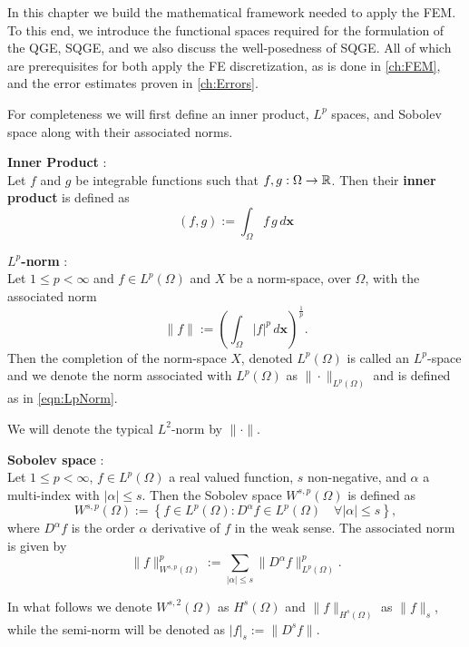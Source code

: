In this chapter we build the mathematical framework needed to apply the FEM. To
this end, we introduce the functional spaces required for the formulation of the
QGE, SQGE, and we also discuss the well-posedness of SQGE. All of which are
prerequisites for both apply the FE discretization, as is done in
\autoref{ch:FEM}, and the error estimates proven in \autoref{ch:Errors}.

For completeness we will first define an inner product, $L^p$ spaces, and
Sobolev space along with their associated norms.

\begin{definition} \label{def:InnerProduct}
  \textbf{Inner Product} \cite{Kreyszig1989}: \\
  Let $f$ and $g$ be integrable functions such that $f,g : \Omega \rightarrow \mathbb{R}$.
  Then their \textbf{inner product} is defined as
  \begin{equation}
    (f,g) := \int_{\Omega}\! f \, g\, d\mathbf{x}
    \label{eqn:InnerProduct}
  \end{equation}
\end{definition}

\begin{definition} \label{def:LpNorm}
  \textbf{$L^p$-norm} \cite{Kreyszig1989}: \\
  Let $1\le p < \infty$ and $f \in L^p(\Omega)$ and $X$ be a norm-space, over
  $\Omega$, with the associated norm
  \begin{equation}
    \|f\| := \left(\int_{\Omega}\! |f|^p\, d\mathbf{x}\right)^{\frac{1}{p}}.
    \label{eqn:LpNorm}
  \end{equation}
  Then the completion of the norm-space $X$, denoted $L^p(\Omega)$ is called an
  $L^p$-space and we denote the norm associated with $L^p(\Omega)$ as
  $\|\cdot\|_{L^p(\Omega)}$ and is defined as in \eqref{eqn:LpNorm}.
\end{definition}
We will denote the typical $L^2$-norm by $\|\cdot\|$.

\begin{definition} \label{SobolevSpace}
  \textbf{Sobolev space} \cite{Evans1989}: \\
  Let $1\le p < \infty$, $f \in L^p(\Omega)$ a real valued function, $s$
  non-negative, and $\alpha$ a multi-index with $|\alpha| \le s$. Then the
  Sobolev space $W^{s,p}(\Omega)$ is defined as
  \begin{equation}
    W^{s,p}(\Omega) := \left\{ f\in L^p(\Omega) : D^{\alpha} f \in
      L^p(\Omega)\quad \forall |\alpha| \le s\right\},
    \label{eqn:Sobolev}
  \end{equation}
  where $D^{\alpha}f$ is the order $\alpha$ derivative of $f$ in the weak sense.
  The associated norm is given by
  \begin{equation}
    \|f\|_{W^{s,p}(\Omega)}^p := \sum_{|\alpha|\le s}
      \|D^{\alpha}f\|_{L^p(\Omega)}^p.
    \label{eqn:HkpNorm}
  \end{equation}
\end{definition}
In what follows we denote $W^{s,2}(\Omega)$ as $H^s(\Omega)$ and
$\|f\|_{H^s(\Omega)}$ as $\|f\|_s$, while the semi-norm will be denoted
as $|f|_s := \|D^s f\|$.
